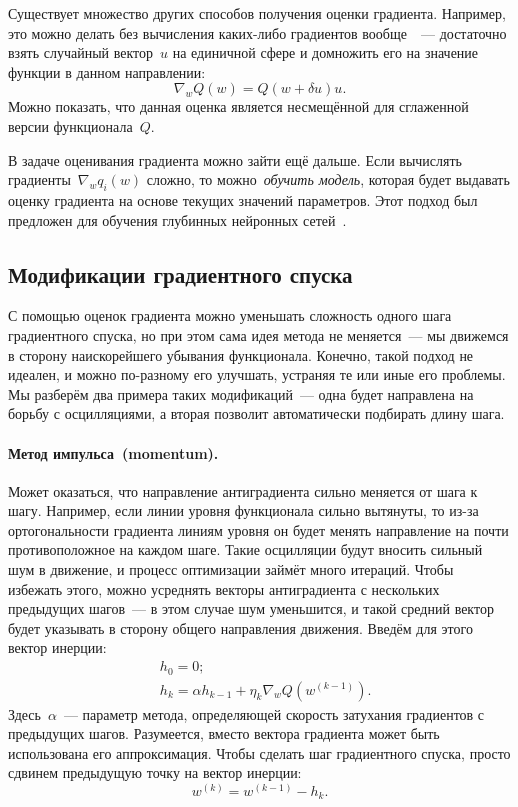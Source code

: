\documentclass[12pt,fleqn]{article}
\begin{document}
Существует множество других способов получения оценки градиента.
Например, это можно делать без вычисления каких-либо градиентов вообще~\cite{flaxman05without}~---
достаточно взять случайный вектор~$u$ на единичной сфере и домножить его
на значение функции в данном направлении:
\[
    \nabla_w Q(w)
    =
    Q(w + \delta u) u.
\]
Можно показать, что данная оценка является несмещённой для сглаженной версии функционала~$Q$.

В задаче оценивания градиента можно зайти ещё дальше.
Если вычислять градиенты~$\nabla_w q_i(w)$ сложно,
то можно~\emph{обучить модель}, которая будет выдавать оценку градиента на основе текущих значений параметров.
Этот подход был предложен для обучения глубинных нейронных сетей~\cite{jaderberg16synthetic}.

\subsection{Модификации градиентного спуска}

С помощью оценок градиента можно уменьшать сложность одного шага градиентного спуска,
но при этом сама идея метода не меняется~--- мы движемся в сторону наискорейшего убывания функционала.
Конечно, такой подход не идеален, и можно по-разному его улучшать, устраняя те или иные его проблемы.
Мы разберём два примера таких модификаций~--- одна будет направлена на борьбу с осцилляциями, а вторая
позволит автоматически подбирать длину шага.

\paragraph{Метод импульса~(momentum).}
Может оказаться, что направление антиградиента сильно меняется от шага к шагу.
Например, если линии уровня функционала сильно вытянуты, то из-за ортогональности градиента линиям уровня
он будет менять направление на почти противоположное на каждом шаге.
Такие осцилляции будут вносить сильный шум в движение, и процесс оптимизации займёт много итераций.
Чтобы избежать этого, можно усреднять векторы антиградиента с нескольких предыдущих шагов~--- в этом
случае шум уменьшится, и такой средний вектор будет указывать в сторону общего направления движения.
Введём для этого вектор инерции:
\begin{align*}
    &h_0 = 0;\\
    &h_k = \alpha h_{k - 1} + \eta_k \nabla_w Q(w^{(k-1)}).
\end{align*}
Здесь~$\alpha$~--- параметр метода, определяющей скорость затухания градиентов с предыдущих шагов.
Разумеется, вместо вектора градиента может быть использована его аппроксимация.
Чтобы сделать шаг градиентного спуска, просто сдвинем предыдущую точку на вектор инерции:
\[
    w^{(k)} = w^{(k-1)} - h_k.
\]
\end{document}
